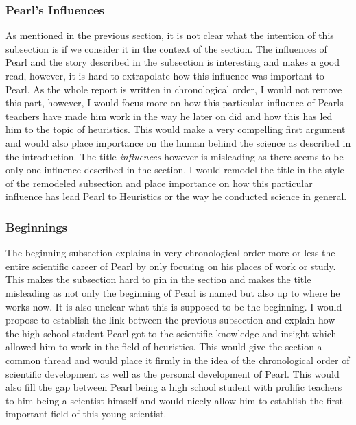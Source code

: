 \documentclass{article}
\begin{document}
\subsubsection{Pearl's Influences}
As mentioned in the previous section, it is not clear what the intention of this subsection is if we consider it in the context of the section. The influences of Pearl and the story described in the subsection is interesting and makes a good read, however, it is hard to extrapolate how this influence was important to Pearl. As the whole report is written in chronological order, I would not remove this part, however, I would focus more on how this particular influence of Pearls teachers have made him work in the way he later on did and how this has led him to the topic of heuristics. This would make a very compelling first argument and would also place importance on the human behind the science as described in the introduction. The title \textit{influences} however is misleading as there seems to be only one influence described in the section. I would remodel the title in the style of the remodeled subsection and place importance on how this particular influence has lead Pearl to Heuristics or the way he conducted science in general.

\subsubsection{Beginnings}
The beginning subsection explains in very chronological order more or less the entire scientific career of Pearl by only focusing on his places of work or study. This makes the subsection hard to pin in the section and makes the title misleading as not only the beginning of Pearl is named but also up to where he works now. It is also unclear what this is supposed to be the beginning. I would propose to establish the link between the previous subsection and explain how the high school student Pearl got to the scientific knowledge and insight which allowed him to work in the field of heuristics. This would give the section a common thread and would place it firmly in the idea of the chronological order of scientific development as well as the personal development of Pearl. This would also fill the gap between Pearl being a high school student with prolific teachers to him being a scientist himself and would nicely allow him to establish the first important field of this young scientist.
\end{document}
